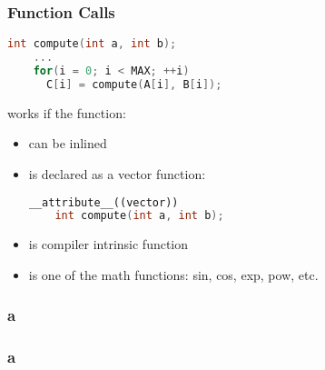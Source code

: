 \documentclass{beamer}
\begin{document}
\begin{frame}[fragile]
  \frametitle{Function Calls}
     
     \begin{lstlisting}[language=C++]
	int compute(int a, int b);
	...
	for(i = 0; i < MAX; ++i) 
	  C[i] = compute(A[i], B[i]);   
     \end{lstlisting}
    
    works if the function:
    \begin{itemize}
     \item can be inlined
     \item is declared as a vector function:
     \begin{lstlisting}[language=C++]
	__attribute__((vector))
	int compute(int a, int b);
     \end{lstlisting}

     \item is compiler intrinsic function
     \item is one of the math functions: sin, cos, exp, pow, etc.
    \end{itemize}    
\end{frame}

\begin{frame}[fragile]
  \frametitle{a}
\end{frame}

\begin{frame}[fragile]
  \frametitle{a}
\end{frame}
\end{document}
